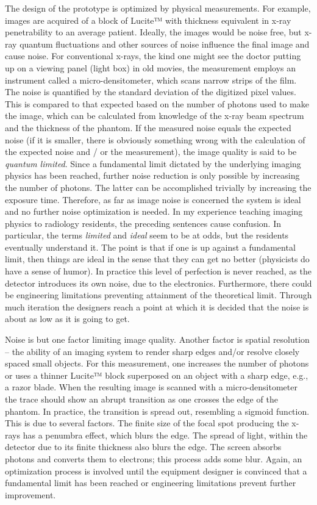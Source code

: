 \documentclass[
]{book}
\begin{document}
The design of the prototype is optimized by physical measurements. For example, images are acquired of a block of Lucite™ with thickness equivalent in x-ray penetrability to an average patient. Ideally, the images would be noise free, but x-ray quantum fluctuations and other sources of noise influence the final image and cause noise. For conventional x-rays, the kind one might see the doctor putting up on a viewing panel (light box) in old movies, the measurement employs an instrument called a micro-densitometer, which scans narrow strips of the film. The noise is quantified by the standard deviation of the digitized pixel values. This is compared to that expected based on the number of photons used to make the image, which can be calculated from knowledge of the x-ray beam spectrum and the thickness of the phantom. If the measured noise equals the expected noise (if it is smaller, there is obviously something wrong with the calculation of the expected noise and / or the measurement), the image quality is said to be \emph{quantum limited}. Since a fundamental limit dictated by the underlying imaging physics has been reached, further noise reduction is only possible by increasing the number of photons. The latter can be accomplished trivially by increasing the exposure time. Therefore, as far as image noise is concerned the system is ideal and no further noise optimization is needed. In my experience teaching imaging physics to radiology residents, the preceding sentences cause confusion. In particular, the terms \emph{limited} and \emph{ideal} seem to be at odds, but the residents eventually understand it. The point is that if one is up against a fundamental limit, then things are ideal in the sense that they can get no better (physicists do have a sense of humor). In practice this level of perfection is never reached, as the detector introduces its own noise, due to the electronics. Furthermore, there could be engineering limitations preventing attainment of the theoretical limit. Through much iteration the designers reach a point at which it is decided that the noise is about as low as it is going to get.

Noise is but one factor limiting image quality. Another factor is spatial resolution -- the ability of an imaging system to render sharp edges and/or resolve closely spaced small objects. For this measurement, one increases the number of photons or uses a thinner Lucite™ block superposed on an object with a sharp edge, e.g., a razor blade. When the resulting image is scanned with a micro-densitometer the trace should show an abrupt transition as one crosses the edge of the phantom. In practice, the transition is spread out, resembling a sigmoid function. This is due to several factors. The finite size of the focal spot producing the x-rays has a penumbra effect, which blurs the edge. The spread of light, within the detector due to its finite thickness also blurs the edge. The screen absorbs photons and converts them to electrons; this process adds some blur. Again, an optimization process is involved until the equipment designer is convinced that a fundamental limit has been reached or engineering limitations prevent further improvement.
\end{document}
